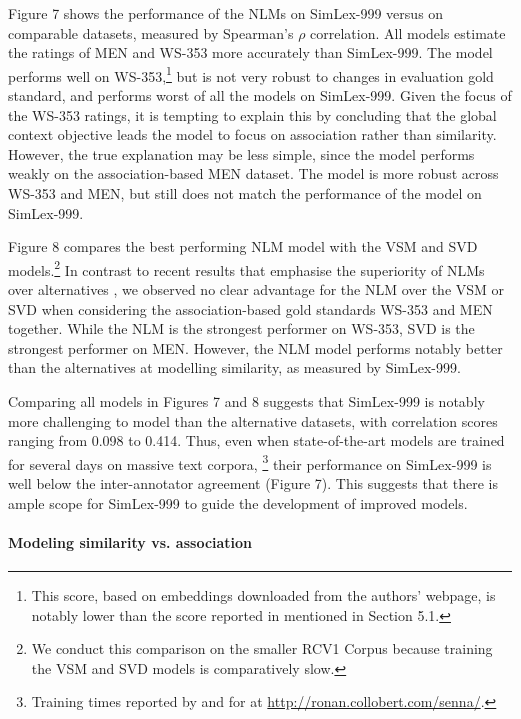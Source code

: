 Figure 7 shows the performance of the NLMs on SimLex-999 versus on comparable datasets, measured by Spearman's \(\rho\) correlation. All models estimate the ratings of MEN and WS-353 more accurately than SimLex-999. The \cite{huang2012improving} model performs well on WS-353,\footnote{This score, based on embeddings downloaded from the authors' webpage, is notably lower than the score reported in \cite{huang2012improving} mentioned in Section 5.1.} but is not very robust to changes in evaluation gold standard, and performs worst of all the models on SimLex-999. Given the focus of the WS-353 ratings, it is tempting to explain this by concluding that the global context objective leads the \cite{huang2012improving} model to focus on association rather than similarity. However, the true explanation may be less simple, since the \cite{huang2012improving} model performs weakly on the association-based MEN dataset. The \cite{collobert2008unified} model is more robust across WS-353 and MEN, but still does not match the performance of the \cite{mikolov2013efficient} model on SimLex-999. 

Figure 8 compares the best performing NLM model \cite{mikolov2013efficient} with the VSM and SVD models.\footnote{We conduct this comparison on the smaller RCV1 Corpus \cite{lewis2004rcv1} because training the VSM and SVD models is comparatively slow.}  In contrast to recent results that emphasise the superiority of NLMs over alternatives \cite{baroni2014don}, we observed no clear advantage for the NLM over the VSM or SVD when considering the association-based gold standards WS-353 and MEN together. While the NLM is the strongest performer on WS-353, SVD is the strongest performer on MEN. However, the NLM model performs notably better than the alternatives at modelling similarity, as measured by SimLex-999. 

Comparing all models in Figures 7 and 8 suggests that SimLex-999 is notably more challenging to model than the alternative datasets, with correlation scores ranging from 0.098 to 0.414. Thus, even when state-of-the-art models are trained for several days on massive text corpora, \footnote{Training times reported by \cite{huang2012improving} and for \cite{collobert2008unified} at \url{http://ronan.collobert.com/senna/}.} their performance on SimLex-999 is well below the inter-annotator agreement (Figure 7). This suggests that there is ample scope for SimLex-999 to guide the development of improved models. 

\paragraph{\bf Modeling similarity vs. association}

